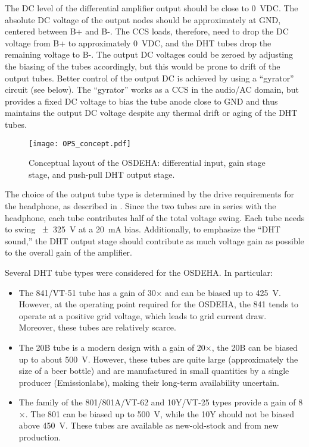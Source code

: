 The DC level of the differential amplifier output should be close to \SI{0}{VDC}. The absolute DC voltage of the output nodes should be approximately at GND, centered between B+ and B-. The CCS loads, therefore, need to drop the DC voltage from B+ to approximately \SI{0}{VDC}, and the DHT tubes drop the remaining voltage to B-. The output DC voltages could be zeroed by adjusting the biasing of the tubes accordingly, but this would be prone to drift of the output tubes. Better control of the output DC is achieved by using a ``gyrator'' circuit (see below). The ``gyrator'' works as a CCS in the audio/AC domain, but provides a fixed DC voltage to bias the tube anode close to GND and thus maintains the output DC voltage despite any thermal drift or aging of the DHT tubes.

\begin{figure}
\begin{center}
\texttt{[image: OPS\_concept.pdf]}
\caption{Conceptual layout of the OSDEHA: differential input, gain stage stage, and push-pull DHT output stage.}
\end{center}
\end{figure}

The choice of the output tube type is determined by the drive requirements for the headphone, as described in . Since the two tubes are in series with the headphone, each tube contributes half of the total voltage swing. Each tube needs to swing \SI{\pm325}{V} at a \SI{20}{mA} bias. Additionally, to emphasize the ``DHT sound,'' the DHT output stage should contribute as much voltage gain as possible to the overall gain of the amplifier.

Several DHT tube types were considered for the OSDEHA\cite{osdeha_p9,osdeha_whichDHT}. In particular:

\begin{itemize}
\item The 841/VT-51 tube has a gain of 30$\times$ and can be biased up to \SI{425}{V}. However, at the operating point required for the OSDEHA, the 841 tends to operate at a positive grid voltage, which leads to grid current draw. Moreover, these tubes are relatively scarce.
\item The 20B tube is a modern design with a gain of 20$\times$, the 20B can be biased up to about \SI{500}{V}. However, these tubes are quite large (approximately the size of a beer bottle) and are manufactured in small quantities by a single producer (Emissionlabs), making their long-term availability uncertain.
\item The family of the 801/801A/VT-62 and 10Y/VT-25 types\cite{aasyl_801types} provide a gain of 8$\times$. The 801 can be biased up to \SI{500}{V}, while the 10Y should not be biased above \SI{450}{V}. These tubes are available as new-old-stock and from new production.
\end{itemize}

